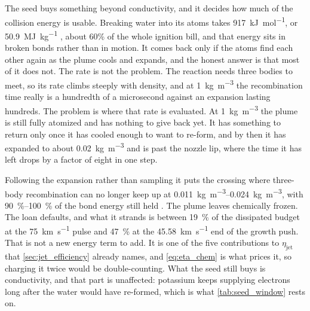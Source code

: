 \documentclass{article}
\begin{document}
The seed buys something beyond conductivity, and it decides how much of the collision energy is usable. Breaking water into its atoms takes \SI{917}{\kilo\joule\per\mole}, or \SI{50.9}{\mega\joule\per\kilogram} \cite{crc_handbook}, about 60\% of the whole ignition bill, and that energy sits in broken bonds rather than in motion. It comes back only if the atoms find each other again as the plume cools and expands, and the honest answer is that most of it does not. The rate is not the problem. The reaction needs three bodies to meet, so its rate climbs steeply with density, and at \SI{1}{\kilogram\per\cubic\meter} the recombination time really is a hundredth of a microsecond against an expansion lasting hundreds. The problem is where that rate is evaluated. At \SI{1}{\kilogram\per\cubic\meter} the plume is still fully atomized and has nothing to give back yet. It has something to return only once it has cooled enough to want to re-form, and by then it has expanded to about \SI{0.02}{\kilogram\per\cubic\meter} and is past the nozzle lip, where the time it has left drops by a factor of eight in one step.

Following the expansion rather than sampling it puts the crossing where three-body recombination can no longer keep up at \SIrange{0.011}{0.024}{\kilogram\per\cubic\meter}, with \SIrange{90}{100}{\percent} of the bond energy still held \cite{Katz_puffsat_impact_sim_2026}. The plume leaves chemically frozen. The loan defaults, and what it strands is between \SI{19}{\percent} of the dissipated budget at the \SI{75}{\kilo\meter\per\second} pulse and \SI{47}{\percent} at the \SI{45.58}{\kilo\meter\per\second} end of the growth push. That is not a new energy term to add. It is one of the five contributions to $\eta_{\mathrm{jet}}$ that \autoref{sec:jet_efficiency} already names, and \autoref{eq:eta_chem} is what prices it, so charging it twice would be double-counting. What the seed still buys is conductivity, and that part is unaffected: potassium keeps supplying electrons long after the water would have re-formed, which is what \autoref{tab:seed_window} rests on.
\end{document}
